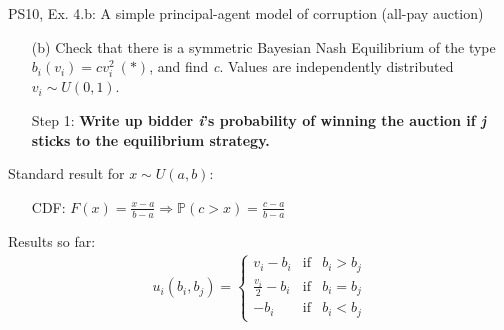 \begin{frame}{PS10, Ex. 4.b: A simple principal-agent model of corruption (all-pay auction)}
    \begin{itemize}
      \item[(b)] Check that there is a symmetric Bayesian Nash Equilibrium of the type $b_i(v_i) = cv_i^2\ (*)$, and find \textit{c}. Values are independently distributed $v_i\sim U(0, 1)$.
    \end{itemize} \vspace{-8pt}
    \begin{multicols}{2}
      \begin{itemize}
        \item[Step 1:] \textbf{Write up bidder \textit{i}'s probability of winning the auction if \textit{j} sticks to the equilibrium strategy.}
      \end{itemize}
      \vfill\null\columnbreak
      Standard result for $x\sim U(a, b):$ \vspace{-6pt}
      \begin{itemize}
        \item[CDF:] $F(x)=\frac{x-a}{b-a}\Rightarrow\mathbb{P}(c>x)=\frac{c-a}{b-a}$
      \end{itemize}
      \vspace{-6pt}
      Results so far: \vspace{-6pt}
      \begin{align*}
        u_i(b_i,b_j)=\left\{\begin{array}{lcl}
          v_i-b_i           & \text{if} & b_i>b_j \\
          \frac{v_i}{2}-b_i & \text{if} & b_i=b_j \\
          -b_i              & \text{if} & b_i<b_j
        \end{array}\right.
      \end{align*}
      \vfill\null
    \end{multicols}
\end{frame}
